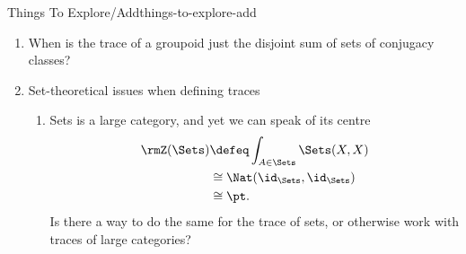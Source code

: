 \begin{remark}{Things To Explore/Add}{things-to-explore-add}
\begin{enumerate}
\begin{enumerate}
                \item Posets
                    \begin{enumerate}
                        \item $\FontForCategories{Open}(X)$
                    \end{enumerate}
                \item Trace of small but non-finite categories:
                    \begin{enumerate}
                        \item $\Sets$
                        \item $\FontForCategories{Rep}(G)$
                        \item category of finite groups
                        \item category of finite abelian groups
                        \item category of finite $p$-groups for fixed $p$
                        \item category of finite $p$-groups for all $p$
                        \item category of finite fields
                        \item category of finite topological spaces
                        \item category of finite [insert a mathematical object here]
                    \end{enumerate}
            \end{enumerate}
        \item When is the trace of a groupoid just the disjoint sum of sets of conjugacy classes?
        \item Set-theoretical issues when defining traces
            \begin{enumerate}
                \item Sets is a large category, and yet we can speak of its centre
                    \begin{align*}
                        \rmZ(\Sets) &\defeq \int_{A\in\Sets}\Sets(X,X)\\%
                                    &\cong  \Nat(\id_{\Sets},\id_{\Sets})\\
                                    &\cong  \pt.
                    \end{align*}
                    Is there a way to do the same for the trace of sets, or otherwise work with traces of large categories?
            \end{enumerate}

\end{enumerate}
\end{remark}
